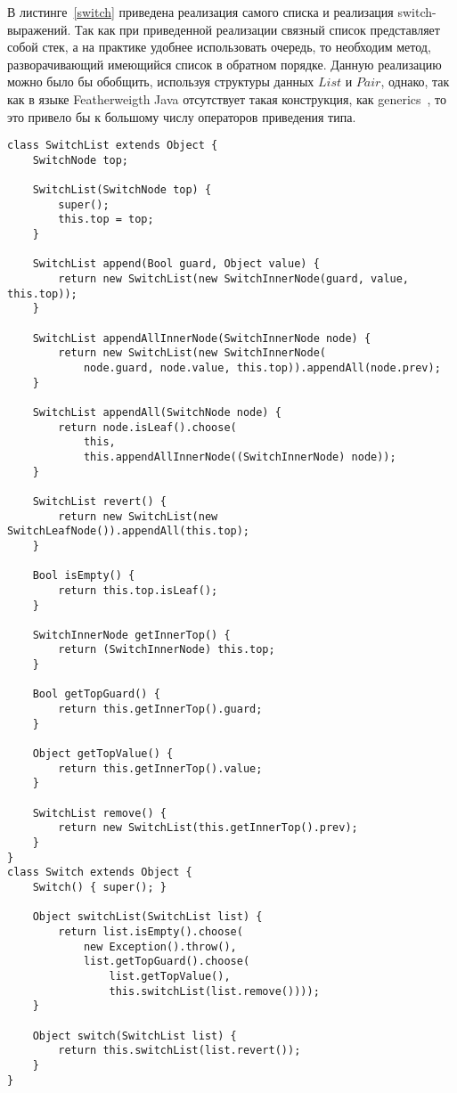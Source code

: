 В листинге~\ref{switch} приведена реализация самого списка и реализация switch-выражений. Так как при приведенной реализации связный список представляет собой стек,
а на практике удобнее использовать очередь, то необходим метод, разворачивающий имеющийся список в обратном порядке.
Данную реализацию можно было бы обобщить, используя структуры данных $List$ и $Pair$, однако,
так как в языке Featherweigth Java отсутствует такая конструкция, как generics~\cite{java},
то это привело бы к большому числу операторов приведения типа.
\begin{lstlisting}[float=htb,label=switch,caption=Определение switch-выражений.]
class SwitchList extends Object {
    SwitchNode top;

    SwitchList(SwitchNode top) {
        super();
        this.top = top;
    }

    SwitchList append(Bool guard, Object value) {
        return new SwitchList(new SwitchInnerNode(guard, value, this.top));
    }

    SwitchList appendAllInnerNode(SwitchInnerNode node) {
        return new SwitchList(new SwitchInnerNode(
            node.guard, node.value, this.top)).appendAll(node.prev);
    }

    SwitchList appendAll(SwitchNode node) {
        return node.isLeaf().choose(
            this,
            this.appendAllInnerNode((SwitchInnerNode) node));
    }

    SwitchList revert() {
        return new SwitchList(new SwitchLeafNode()).appendAll(this.top);
    }

    Bool isEmpty() {
        return this.top.isLeaf();
    }

    SwitchInnerNode getInnerTop() {
        return (SwitchInnerNode) this.top;
    }

    Bool getTopGuard() {
        return this.getInnerTop().guard;
    }

    Object getTopValue() {
        return this.getInnerTop().value;
    }

    SwitchList remove() {
        return new SwitchList(this.getInnerTop().prev);
    }
}
class Switch extends Object {
    Switch() { super(); }

    Object switchList(SwitchList list) {
        return list.isEmpty().choose(
            new Exception().throw(),
            list.getTopGuard().choose(
                list.getTopValue(),
                this.switchList(list.remove())));
    }

    Object switch(SwitchList list) {
        return this.switchList(list.revert());
    }
}
\end{lstlisting}

